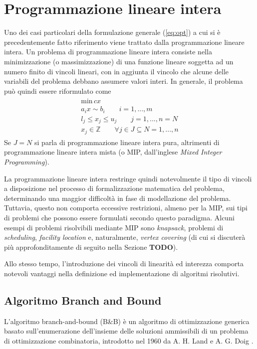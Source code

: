 \section{Programmazione lineare intera}
Uno dei casi particolari della formulazione generale (\ref{eq:opt}) a cui si è precedentemente fatto riferimento viene trattato dalla 
programmazione lineare intera.
Un problema di programmazione lineare intera consiste nella minimizzazione (o massimizzazione) di una funzione lineare soggetta ad un 
numero finito di vincoli lineari, con in aggiunta il vincolo che alcune delle variabili del problema debbano assumere valori interi. 
In generale, il problema può quindi essere riformulato come
\begin{align*}
	\label{eq:linprog}
	\begin{array}{l}
      \text{min} \, cx\\
      a_i x \sim b_i \qquad i=1,...,m \\
      l_j \leq x_j \leq u_j \qquad j=1,...,n =N \\
      x_j \in \mathbb{Z}  \qquad \forall j \in J \subseteq N = {1,...,n}	
	\end{array}
\end{align*}
\indent
Se $J=N$ si parla di programmazione lineare intera pura, altrimenti di programmazione lineare intera mista (o MIP, dall'inglese 
\textit{Mixed Integer Programming}).

La programmazione lineare intera restringe quindi notevolmente il tipo di vincoli a disposizione nel
processo di formalizzazione matematica del problema, determinando una maggior difficoltà in fase di modellazione del problema.
Tuttavia, questo non comporta eccessive restrizioni, almeno per la MIP, sui tipi di problemi che possono essere formulati secondo
questo paradigma. Alcuni esempi di problemi risolvibili mediante MIP sono \textit{knapsack}, problemi di \textit{scheduling}, 
\textit{facility location} e, naturalmente, \textit{vertex covering} (di cui si discuterà più approfonditamente di seguito
nella Sezione \textbf{TODO}).

Allo stesso tempo, l'introduzione dei vincoli di linearità ed interezza comporta notevoli vantaggi nella definizione ed
implementazione di algoritmi risolutivi. 

\subsection{Algoritmo Branch and Bound}
L'algoritmo branch-and-bound (B\&B) è un algoritmo di ottimizzazione generica basato sull'enumerazione dell'insieme delle soluzioni
ammissibili di un problema di ottimizzazione combinatoria, introdotto nel 1960 da A. H. Land e A. G. Doig \cite{10.2307/1910129}. 

